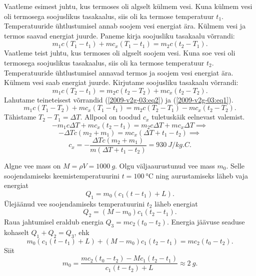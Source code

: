 \documentclass[10pt, twoside]{article}
\begin{document}
{Vaatleme esimest juhtu, kus termoses oli algselt külmem vesi. Kuna külmem vesi oli termosega soojuslikus tasakaalus, siis oli ka termose temperatuur $t_1$. Temperatuuride
ühtlustumisel annab soojem vesi energiat ära. Külmem vesi ja termos saavad energiat juurde. Paneme kirja soojusliku tasakaalu võrrandi:
\begin{equation}
m_{1} c\left(T_{1}-t_{1}\right)+m c_{x}\left(T_{1}-t_{1}\right)=m_{2} c\left(t_{2}-T_{1}\right).
\label{2009-v2g-03:eq1}
\end{equation}
Vaatleme teist juhtu, kus termoses oli algselt soojem vesi. Kuna soe vesi oli termosega soojuslikus tasakaalus, siis oli ka termose temperatuur $t_2$. Temperatuuride
ühtlustumisel annavad termos ja soojem vesi energiat ära. Külmem vesi saab energiat juurde. Kirjutame soojusliku tasakaalu võrrandi:
\begin{equation}
m_{1} c\left(T_{2}-t_{1}\right)=m_{2} c\left(t_{2}-T_{2}\right)+m c_{x}\left(t_{2}-T_{2}\right).
\label{2009-v2g-03:eq2}
\end{equation}
Lahutame teineteisest võrrandid (\ref{2009-v2g-03:eq2}) ja (\ref{2009-v2g-03:eq1}).
\[
m_{1} c\left(T_{1}-T_{2}\right)+m c_{x}\left(T_{1}-t_{1}\right)=m_{2} c\left(T_{2}-T_{1}\right)-m c_{x}\left(t_{2}-T_{2}\right).
\]
Tähistame $T_2 - T_1 = \Delta T$. Allpool on toodud $c_x$ tuletuskäik eelnevast valemist.
\[
-m_{1} c \Delta T+m c_{x}\left(t_{2}-t_{1}\right)=m_{2} c \Delta T+m c_{x} \Delta T\implies
\]
\[
-\Delta T c\left(m_{2}+m_{1}\right)=m c_{x}\left(\Delta T+t_{1}-t_{2}\right)\implies
\]
\[
c_{x}=-\frac{\Delta T c\left(m_{2}+m_{1}\right)}{m\left(\Delta T+t_{1}-t_{2}\right)}=\SI{930}{J/kg.C}.
\]
\probend
\bigskip


\solu
Algne vee mass on $M=\rho V=\SI{1000}{g}$. Olgu väljaaurustunud vee mass $m_0$. Selle soojendamiseks keemistemperatuurini $t=\SI{100}{\degreeCelsius}$ ning aurustamiseks läheb vaja energiat
\[
Q_1=m_0(c_1(t-t_1)+L).
\]
Ülejäänud vee soojendamiseks temperatuurini $t_2$ läheb energiat
\[
Q_2=(M-m_0)c_1(t_2-t_1).
\]
Raua jahtumisel eraldub energia $Q_3=mc_2(t_0-t_2)$. Energia jäävuse seaduse kohaselt $Q_1+Q_2=Q_3$, ehk
\[
m_0(c_1(t-t_1)+L)+(M-m_0)c_1(t_2-t_1)=mc_2(t_0-t_2).
\]
Siit
\[
m_0=\frac{mc_2(t_0-t_2)-Mc_1(t_2-t_1)}{c_1(t-t_2)+L}\approx \SI{2}{g}.
\]
\probend
\bigskip


}
\end{document}
